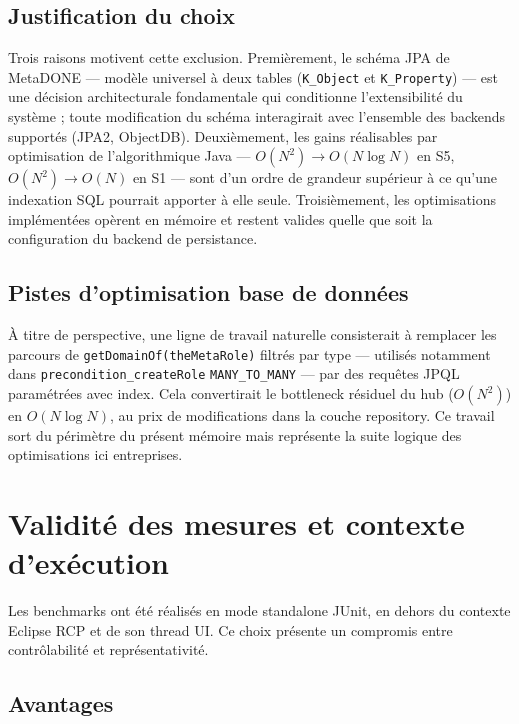 \subsection*{Justification du choix}

Trois raisons motivent cette exclusion. Premièrement, le schéma JPA de MetaDONE — modèle universel à deux tables (\texttt{K\_Object} et \texttt{K\_Property}) — est une décision architecturale fondamentale qui conditionne l'extensibilité du système ; toute modification du schéma interagirait avec l'ensemble des backends supportés (JPA2, ObjectDB). Deuxièmement, les gains réalisables par optimisation de l'algorithmique Java — $O(N^2) \rightarrow O(N \log N)$ en S5, $O(N^2) \rightarrow O(N)$ en S1 — sont d'un ordre de grandeur supérieur à ce qu'une indexation SQL pourrait apporter à elle seule. Troisièmement, les optimisations implémentées opèrent en mémoire et restent valides quelle que soit la configuration du backend de persistance.

\subsection*{Pistes d'optimisation base de données}

À titre de perspective, une ligne de travail naturelle consisterait à remplacer les parcours de \texttt{getDomainOf(theMetaRole)} filtrés par type — utilisés notamment dans \texttt{precondition\_createRole} \texttt{MANY\_TO\_MANY} — par des requêtes JPQL paramétrées avec index. Cela convertirait le bottleneck résiduel du hub ($O(N^2)$) en $O(N \log N)$, au prix de modifications dans la couche repository. Ce travail sort du périmètre du présent mémoire mais représente la suite logique des optimisations ici entreprises.

\section{Validité des mesures et contexte d'exécution}
\label{sec:validite-mesures}

Les benchmarks ont été réalisés en mode standalone JUnit, en dehors du contexte Eclipse RCP et de son thread UI. Ce choix présente un compromis entre contrôlabilité et représentativité.

\subsection*{Avantages}

